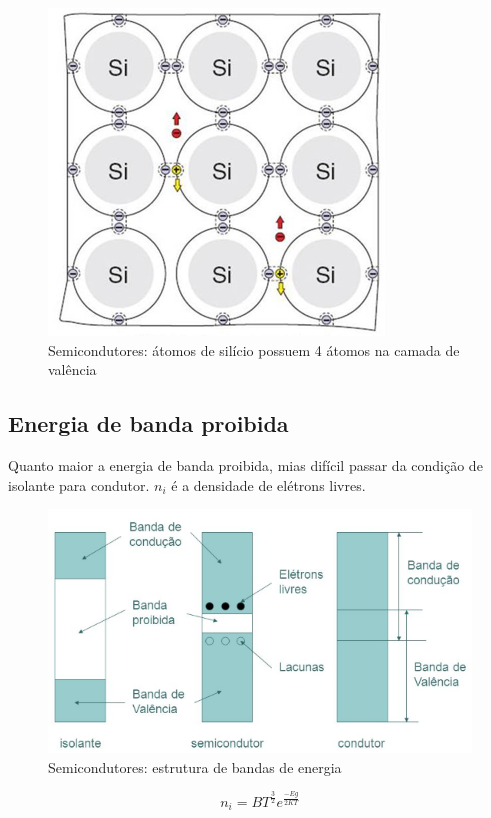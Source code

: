 \documentclass{PETeletrica}
\begin{document}
\begin{multicols}{2}
\begin{figure}[H]
\centering
\includegraphics[width=0.75\columnwidth]{silicio}
\caption{Semicondutores: átomos de silício possuem 4 átomos na camada de valência}
\end{figure}


\subsection{Energia de banda proibida}
Quanto maior a energia de banda proibida, mias difícil passar da condição de isolante para condutor.
$ n_i$ é a densidade de elétrons livres.

\begin{figure}[H]
\centering
\includegraphics[width=0.9\columnwidth]{banda}
\caption{Semicondutores: estrutura de bandas de energia}
\end{figure}


\begin{equation} \label{eq}
n_i=BT^{\frac{3}{2}} e^{\frac{-Eg}{2KT}}
\end{equation}


\end{multicols}
\end{document}
